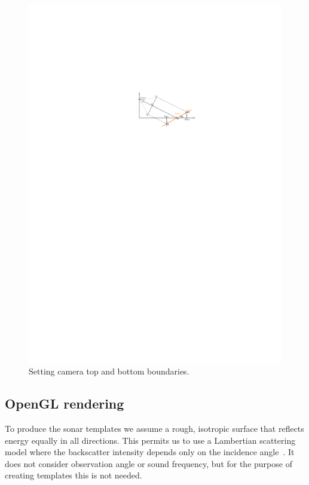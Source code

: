 \begin{figure}[t]\centering%
\includegraphics[drawing,width=\linewidth]{gfx/opengl_part.svg}%
\caption{Setting camera top and bottom boundaries.}\label{camera_top_bottom}%
\end{figure}



\subsection{OpenGL rendering}

To produce the sonar templates we assume a rough, isotropic surface that reflects energy equally in all directions. This permits us to use a Lambertian scattering model where the backscatter intensity depends only on the incidence angle~\cite{Zhang1999}. It does not consider observation angle or sound frequency, but for the purpose of creating templates this is not needed.   

